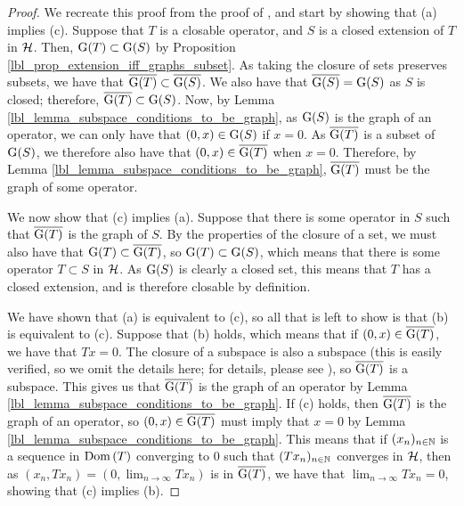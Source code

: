 \begin{proof}
    We recreate this proof from the proof of {\cite[Proposition 1.5]{konrad}}, and start by showing that (a) implies (c). Suppose that $T$ is a closable operator, and $S$ is a closed extension of $T$ in $\mathcal{H}$. Then, $\operatorname{G}(T) \subset \operatorname{G}(S)$ by Proposition \eqref{lbl_prop_extension_iff_graphs_subset}. As taking the closure of sets preserves subsets, we have that $\overline{\operatorname{G}(T)} \subset \overline{\operatorname{G}(S)}$. We also have that $\overline{\operatorname{G}(S)} = \operatorname{G}(S)$ as $S$ is closed; therefore, $\overline{\operatorname{G}(T)} \subset \operatorname{G}(S)$. Now, by  Lemma \eqref{lbl_lemma_subspace_conditions_to_be_graph}, as $\operatorname{G}(S)$ is the graph of an operator, we can only have that $(0, x) \in \operatorname{G}(S)$ if $x = 0$. As $\overline{\operatorname{G}(T)}$ is a subset of $\operatorname{G}(S)$, we therefore also have that $(0, x) \in \overline{\operatorname{G}(T)}$ when $x = 0$. Therefore, by Lemma \eqref{lbl_lemma_subspace_conditions_to_be_graph}, $\overline{\operatorname{G}(T)}$ must be the graph of some operator.

    \medskip

    We now  show that (c) implies (a). Suppose that there is some operator in $S$ such that $\overline{\operatorname{G}(T)}$ is the graph of $S$. By the properties of the closure of a set, we must also have that $\operatorname{G}(T) \subset \overline{\operatorname{G}(T)}$, so $\operatorname{G}(T) \subset \operatorname{G}(S)$, which means that there is some operator $T \subset S$ in $\mathcal{H}$. As $\operatorname{G}(S)$ is clearly a closed set, this means that $T$ has a closed extension, and is therefore closable by definition.

    \medskip

    We have shown that (a) is equivalent to (c), so all that is left to show is that (b) is equivalent to (c). Suppose that (b) holds, which means that if $(0, x) \in \overline{\operatorname{G}(T)}$, we have that $Tx = 0$. The closure of a subspace is also a subspace (this is easily verified, so we omit the details here; for details, please see {\cite[Proposition 7.10]{muscat}}), so $\overline{\operatorname{G}(T)}$ is a subspace. This gives us that $\overline{\operatorname{G}(T)}$ is the graph of an operator by Lemma \eqref{lbl_lemma_subspace_conditions_to_be_graph}. If (c) holds, then $\overline{\operatorname{G}(T)}$ is the graph of an operator, so $(0, x) \in \overline{\operatorname{G}(T)}$ must imply that $x = 0$ by Lemma \eqref{lbl_lemma_subspace_conditions_to_be_graph}. This means that if $(x_n)_{n \in \mathbb{N}}$ is a sequence in $\operatorname{Dom}\left(T\right)$ converging to 0  such that $(Tx_n)_{n \in \mathbb{N}}$ converges in $\mathcal{H}$, then as $(x_n, Tx_n) = (0, \lim_{n \to \infty} Tx_n)$ is in $\overline{\operatorname{G}(T)}$, we have that $\lim_{n \to \infty}Tx_n = 0$, showing that (c) implies (b).
\end{proof}
